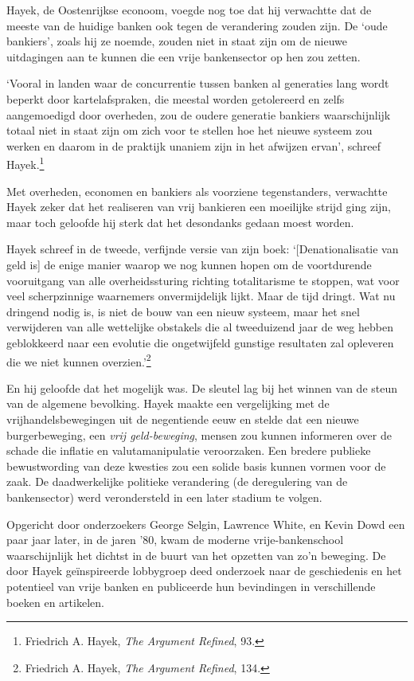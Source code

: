 \documentclass[
  a5paper,
  smalldemyvopaper,11pt,twoside,onecolumn,openright,extrafontsizes,
hidelinks]{memoir}
\begin{document}
Hayek, de Oostenrijkse econoom, voegde nog toe dat hij verwachtte dat de
meeste van de huidige banken ook tegen de verandering zouden zijn. De
`oude bankiers', zoals hij ze noemde, zouden niet in staat zijn om de
nieuwe uitdagingen aan te kunnen die een vrije bankensector op hen zou
zetten.

`Vooral in landen waar de concurrentie tussen banken al generaties lang
wordt beperkt door kartelafspraken, die meestal worden getolereerd en
zelfs aangemoedigd door overheden, zou de oudere generatie bankiers
waarschijnlijk totaal niet in staat zijn om zich voor te stellen hoe het
nieuwe systeem zou werken en daarom in de praktijk unaniem zijn in het
afwijzen ervan', schreef Hayek.\footnote{Friedrich A. Hayek, \emph{The
  Argument Refined}, 93.}

Met overheden, economen en bankiers als voorziene tegenstanders,
verwachtte Hayek zeker dat het realiseren van vrij bankieren een
moeilijke strijd ging zijn, maar toch geloofde hij sterk dat het
desondanks gedaan moest worden.

Hayek schreef in de tweede, verfijnde versie van zijn boek:
`{[}Denationalisatie van geld is{]} de enige manier waarop we nog kunnen
hopen om de voortdurende vooruitgang van alle overheidssturing richting
totalitarisme te stoppen, wat voor veel scherpzinnige waarnemers
onvermijdelijk lijkt. Maar de tijd dringt. Wat nu dringend nodig is, is
niet de bouw van een nieuw systeem, maar het snel verwijderen van alle
wettelijke obstakels die al tweeduizend jaar de weg hebben geblokkeerd
naar een evolutie die ongetwijfeld gunstige resultaten zal opleveren die
we niet kunnen overzien.'\footnote{Friedrich A. Hayek, \emph{The
  Argument Refined}, 134.}

En hij geloofde dat het mogelijk was. De sleutel lag bij het winnen van
de steun van de algemene bevolking. Hayek maakte een vergelijking met de
vrijhandelsbewegingen uit de negentiende eeuw en stelde dat een nieuwe
burgerbeweging, een \emph{vrij geld-beweging}, mensen zou kunnen
informeren over de schade die inflatie en valutamanipulatie veroorzaken.
Een bredere publieke bewustwording van deze kwesties zou een solide
basis kunnen vormen voor de zaak. De daadwerkelijke politieke
verandering (de deregulering van de bankensector) werd verondersteld in
een later stadium te volgen.

Opgericht door onderzoekers George Selgin, Lawrence White, en Kevin Dowd
een paar jaar later, in de jaren '80, kwam de moderne vrije-bankenschool
waarschijnlijk het dichtst in de buurt van het opzetten van zo'n
beweging. De door Hayek geïnspireerde lobbygroep deed onderzoek naar de
geschiedenis en het potentieel van vrije banken en publiceerde hun
bevindingen in verschillende boeken en artikelen.
\end{document}
